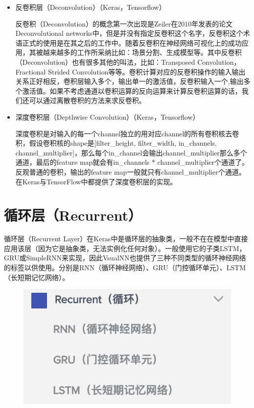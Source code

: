 \documentclass{progbookcn}
\begin{document}
\begin{itemize}
\item 反卷积层（Deconvolution）（Keras，Tensorflow）

  ​	反卷积（Deconvolution）的概念第一次出现是Zeiler在2010年发表的论文Deconvolutional networks中，但是并没有指定反卷积这个名字，反卷积这个术语正式的使用是在其之后的工作中。随着反卷积在神经网络可视化上的成功应用，其被越来越多的工作所采纳比如：场景分割、生成模型等。其中反卷积（Deconvolution）也有很多其他的叫法，比如：Transposed Convolution，Fractional Strided Convolution等等。卷积计算对应的反卷积操作的输入输出关系正好相反，卷积层输入多个，输出单一的激活值，反卷积输入一个,输出多个激活值。如果不考虑通道以卷积运算的反向运算来计算反卷积运算的话，我们还可以通过离散卷积的方法来求反卷积。 

\item 深度卷积层（Depthwise Convolution）（Keras，Tensorflow）

  ​	深度卷积是对输入的每一个channel独立的用对应channel的所有卷积核去卷积，假设卷积核的shape是[filter\_height, filter\_width, in\_channels, channel\_multiplier]，那么每个in\_channel会输出channel\_multiplier那么多个通道，最后的feature map就会有in\_channels * channel\_multiplier个通道了。反观普通的卷积，输出的feature map一般就只有channel\_multiplier个通道。在Keras与TensorFlow中都提供了深度卷积层的实现。

\end{itemize}




\section{循环层（Recurrent）}

循环层（Recurrent Layer）在Keras中是循环层的抽象类，一般不在在模型中直接应用该层（因为它是抽象类，无法实例化任何对象）。一般使用它的子类LSTM，GRU或SimpleRNN来实现，因此VsualNN也提供了三种不同类型的循环神经网络的标签以供使用。分别是RNN（循环神经网络）、GRU（门控循环单元）、LSTM（长短期记忆网络）。
\begin{figure}[H]
  \centering
  \includegraphics[scale = 0.6]{Recurrent_layer.png}
\end{figure}
\end{document}
